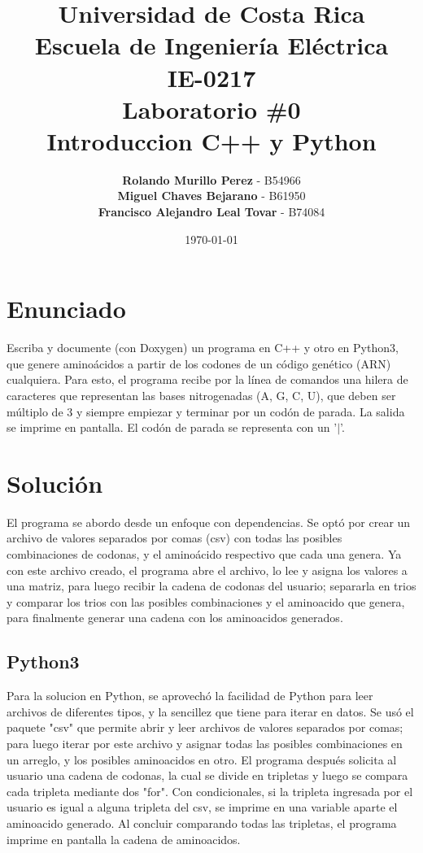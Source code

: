 \documentclass[12pt,letterpaper]{report}
\title{Universidad de Costa Rica \\ Escuela de Ingeniería Eléctrica \\ IE-0217 \\ \textbf{Laboratorio \#0} \\ Introduccion C++ y Python}
\author{\textbf{Rolando Murillo Perez} - B54966 \\ \textbf{Miguel Chaves Bejarano} - B61950 \\ \textbf{Francisco Alejandro Leal Tovar} - B74084}
\date{\today}
\begin{document}
\maketitle
\renewcommand{\labelitemi}{$\checkmark$}


\vspace{7mm}


\tableofcontents



\chapter{Enunciado}
Escriba y documente (con Doxygen) un programa en C++ y otro en Python3, que genere aminoácidos
a partir de los codones de un código genético (ARN) cualquiera. Para esto, el programa recibe
por la línea de comandos una hilera de caracteres que representan las bases nitrogenadas (A, G, C,
U), que deben ser múltiplo de 3 y siempre empiezar y terminar por un codón de parada. La salida se
imprime en pantalla. El codón de parada se representa con un ’$|$’.


\chapter{Solución}

El programa se abordo desde un enfoque con dependencias. Se optó por crear un archivo de valores separados por comas (csv) con todas las posibles combinaciones de codonas, y el aminoácido respectivo que cada una genera. Ya con este archivo creado, el programa abre el archivo, lo lee y asigna los valores a una matriz, para luego recibir la cadena de codonas del usuario; separarla en trios y comparar los trios con las posibles combinaciones y el aminoacido que genera, para finalmente generar una cadena con los aminoacidos generados.

\section{Python3}

Para la solucion en Python, se aprovechó la facilidad de Python para leer archivos de diferentes tipos, y la sencillez que tiene para iterar en datos. Se usó el paquete "csv" que permite abrir y leer archivos de valores separados por comas; para luego iterar por este archivo y asignar todas las posibles combinaciones en un arreglo, y los posibles aminoacidos en otro. El programa después solicita al usuario una cadena de codonas, la cual se divide en tripletas y luego se compara cada tripleta mediante dos "for". Con condicionales, si la tripleta ingresada por el usuario es igual a alguna tripleta del csv, se imprime en una variable aparte el aminoacido generado. Al concluir comparando todas las tripletas, el programa imprime en pantalla la cadena de aminoacidos.
\end{document}
